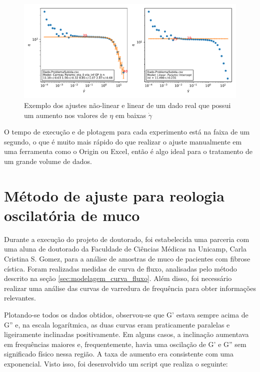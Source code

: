 \begin{apendicesenv}
\begin{figure}
	\centering
	\includegraphics[width=\textwidth]{imagens/reologia/Dado-ProblemaSubida}
	\caption{Exemplo dos ajustes não-linear e linear de um dado real que possui um aumento nos valores de \(\eta\) em baixas \(\dot{\gamma}\)}
	\label{fig:reologia_dado-problemasubida}
\end{figure}

O tempo de execução e de plotagem para cada experimento está na faixa de um segundo, o que é muito mais rápido do que realizar o ajuste manualmente em uma ferramenta como o Origin ou Excel, então é algo ideal para o tratamento de um grande volume de dados.

\section{Método de ajuste para reologia oscilatória de muco}

Durante a execução do projeto de doutorado, foi estabelecida uma parceria com uma aluna de doutorado da Faculdade de Ciências Médicas na Unicamp, Carla Cristina S. Gomez, para a análise de amostras de muco de pacientes com fibrose cística. Foram realizadas medidas de curva de fluxo, analisadas pelo método descrito na seção \ref{sec:modelagem_curva_fluxo}. Além disso, foi necessário realizar uma análise das curvas de varredura de frequência para obter informações relevantes.

Plotando-se todos os dados obtidos, observou-se que G' estava sempre acima de G'' e, na escala logarítmica, as duas curvas eram praticamente paralelas e ligeiramente inclinadas positivamente. Em alguns casos, a inclinação aumentava em frequências maiores e, frequentemente, havia uma oscilação de G' e G'' sem significado físico nessa região. A taxa de aumento era consistente com uma exponencial. Visto isso, foi desenvolvido um script que realiza o seguinte:


\end{apendicesenv}
